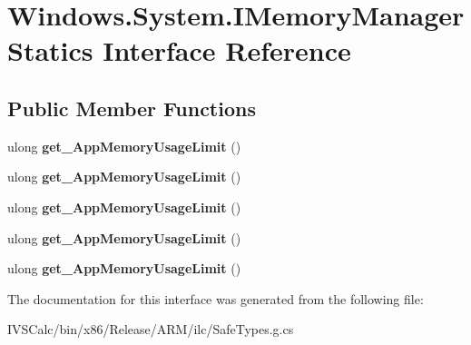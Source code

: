 \hypertarget{interface_windows_1_1_system_1_1_i_memory_manager_statics}{}\section{Windows.\+System.\+I\+Memory\+Manager\+Statics Interface Reference}
\label{interface_windows_1_1_system_1_1_i_memory_manager_statics}
\subsection*{Public Member Functions}
\begin{DoxyCompactItemize}
\item 
\mbox{\label{interface_windows_1_1_system_1_1_i_memory_manager_statics_a01857ddd6cfed5ff74bd9c9468bdf116}} 
ulong {\bfseries get\+\_\+\+App\+Memory\+Usage\+Limit} ()
\item 
\mbox{\label{interface_windows_1_1_system_1_1_i_memory_manager_statics_a01857ddd6cfed5ff74bd9c9468bdf116}} 
ulong {\bfseries get\+\_\+\+App\+Memory\+Usage\+Limit} ()
\item 
\mbox{\label{interface_windows_1_1_system_1_1_i_memory_manager_statics_a01857ddd6cfed5ff74bd9c9468bdf116}} 
ulong {\bfseries get\+\_\+\+App\+Memory\+Usage\+Limit} ()
\item 
\mbox{\label{interface_windows_1_1_system_1_1_i_memory_manager_statics_a01857ddd6cfed5ff74bd9c9468bdf116}} 
ulong {\bfseries get\+\_\+\+App\+Memory\+Usage\+Limit} ()
\item 
\mbox{\label{interface_windows_1_1_system_1_1_i_memory_manager_statics_a01857ddd6cfed5ff74bd9c9468bdf116}} 
ulong {\bfseries get\+\_\+\+App\+Memory\+Usage\+Limit} ()
\end{DoxyCompactItemize}


The documentation for this interface was generated from the following file\+:\begin{DoxyCompactItemize}
\item 
I\+V\+S\+Calc/bin/x86/\+Release/\+A\+R\+M/ilc/Safe\+Types.\+g.\+cs\end{DoxyCompactItemize}
